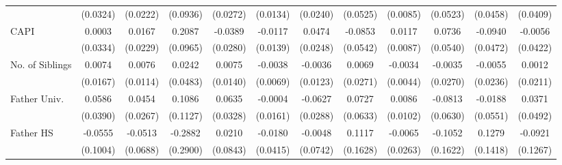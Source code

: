 \begin{table}[htbp]
\begin{tabular}{l*{11}{c}}
            &    (0.0324)         &    (0.0222)         &    (0.0936)         &    (0.0272)         &    (0.0134)         &    (0.0240)         &    (0.0525)         &    (0.0085)         &    (0.0523)         &    (0.0458)         &    (0.0409)         \\
\addlinespace
CAPI        &      0.0003         &      0.0167         &      0.2087\sym{*}  &     -0.0389         &     -0.0117         &      0.0474         &     -0.0853         &      0.0117         &      0.0736         &     -0.0940\sym{*}  &     -0.0056         \\
            &    (0.0334)         &    (0.0229)         &    (0.0965)         &    (0.0280)         &    (0.0139)         &    (0.0248)         &    (0.0542)         &    (0.0087)         &    (0.0540)         &    (0.0472)         &    (0.0422)         \\
\addlinespace
No. of Siblings&      0.0074         &      0.0076         &      0.0242         &      0.0075         &     -0.0038         &     -0.0036         &      0.0069         &     -0.0034         &     -0.0035         &     -0.0055         &      0.0012         \\
            &    (0.0167)         &    (0.0114)         &    (0.0483)         &    (0.0140)         &    (0.0069)         &    (0.0123)         &    (0.0271)         &    (0.0044)         &    (0.0270)         &    (0.0236)         &    (0.0211)         \\
\addlinespace
Father Univ.&      0.0586         &      0.0454         &      0.1086         &      0.0635         &     -0.0004         &     -0.0627\sym{*}  &      0.0727         &      0.0086         &     -0.0813         &     -0.0188         &      0.0371         \\
            &    (0.0390)         &    (0.0267)         &    (0.1127)         &    (0.0328)         &    (0.0161)         &    (0.0288)         &    (0.0633)         &    (0.0102)         &    (0.0630)         &    (0.0551)         &    (0.0492)         \\
\addlinespace
Father HS   &     -0.0555         &     -0.0513         &     -0.2882         &      0.0210         &     -0.0180         &     -0.0048         &      0.1117         &     -0.0065         &     -0.1052         &      0.1279         &     -0.0921         \\
            &    (0.1004)         &    (0.0688)         &    (0.2900)         &    (0.0843)         &    (0.0415)         &    (0.0742)         &    (0.1628)         &    (0.0263)         &    (0.1622)         &    (0.1418)         &    (0.1267)         \\

\end{tabular}
\end{table}
